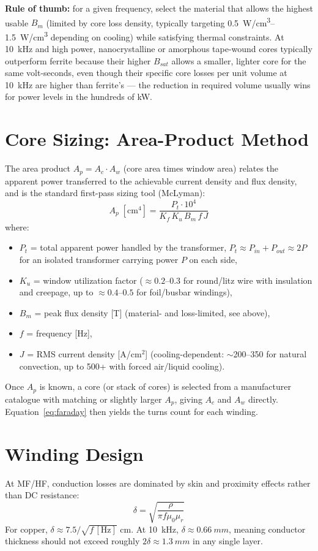 \documentclass[11pt,a4paper]{article}
\begin{document}
\textbf{Rule of thumb:} for a given frequency, select the material that allows the
highest usable $B_m$ (limited by core loss density, typically targeting
\SIrange{0.5}{1.5}{W/cm^3} depending on cooling) while satisfying thermal constraints.
At \SI{10}{kHz} and high power, nanocrystalline or amorphous tape-wound cores
typically outperform ferrite because their higher $B_{sat}$ allows a smaller, lighter
core for the same volt-seconds, even though their specific core losses per unit volume
at \SI{10}{kHz} are higher than ferrite's — the reduction in required volume usually
wins for power levels in the hundreds of kW.

\section{Core Sizing: Area-Product Method}
The area product $A_p = A_c \cdot A_w$ (core area times window area) relates the
apparent power transferred to the achievable current density and flux density,
and is the standard first-pass sizing tool (McLyman):
\begin{equation}
    A_p \;[\text{cm}^4] = \frac{P_t \cdot 10^4}{K_f \, K_u \, B_m \, f \, J}
    \label{eq:ap}
\end{equation}
where:
\begin{itemize}
    \item $P_t$ = total apparent power handled by the transformer, $P_t \approx P_{in}+P_{out} \approx 2P$ for an isolated transformer carrying power $P$ on each side,
    \item $K_u$ = window utilization factor ($\approx 0.2$--$0.3$ for round/litz wire with insulation and creepage, up to $\approx 0.4$--$0.5$ for foil/busbar windings),
    \item $B_m$ = peak flux density [T] (material- and loss-limited, see above),
    \item $f$ = frequency [Hz],
    \item $J$ = RMS current density [A/cm$^2$] (cooling-dependent: $\sim$200--350 for natural convection, up to 500+ with forced air/liquid cooling).
\end{itemize}
Once $A_p$ is known, a core (or stack of cores) is selected from a manufacturer
catalogue with matching or slightly larger $A_p$, giving $A_c$ and $A_w$ directly.
Equation~\eqref{eq:faraday} then yields the turns count for each winding.

\section{Winding Design}
At MF/HF, conduction losses are dominated by skin and proximity effects rather
than DC resistance:
\begin{equation}
    \delta = \sqrt{\frac{\rho}{\pi f \mu_0 \mu_r}}
\end{equation}
For copper, $\delta \approx 7.5/\sqrt{f\,[\text{Hz}]}$ cm. At \SI{10}{kHz},
$\delta \approx \SI{0.66}{mm}$, meaning conductor thickness should not exceed
roughly $2\delta \approx \SI{1.3}{mm}$ in any single layer.
\end{document}
